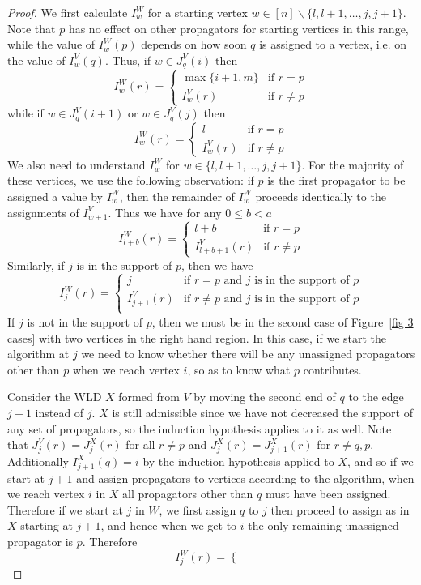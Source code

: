 \documentclass[11pt]{article}
\theoremstyle{remark}
\theoremstyle{definition}
\begin{document}
\begin{proof}
We first calculate $I^{W}_w$ for a starting vertex ${w \in [n]\backslash \{l, l+1, \ldots,j,j+1\}}$. Note that $p$ has no effect on other propagators for starting vertices in this range, while the value of $I^{W}_w(p)$ depends on how soon $q$ is assigned to a vertex, i.e. on the value of $I^{V}_w(q)$. Thus, if $w\in J_q^{V}(i)$ then
    \[
    I_w^{W}(r) =  \begin{cases}
        \max\{i+1, m\} & \text{if } r=p \\
        I_{w}^{V}(r) & \text{if } r\neq p
      \end{cases} 
    \]
    while if $w\in J_q^{V}(i+1)$ or $w\in J_q^{V}(j)$ then
    \[
    I_w^{W}(r) =  \begin{cases}
        l & \text{if } r=p \\
        I_{w}^{V}(r) & \text{if } r\neq p
      \end{cases} 
      \]
We also need to understand $I^{W}_w$ for $w \in \{l,l+1,\ldots,j,j+1\}$. For the majority of these vertices, we use the following observation: if $p$ is the first propagator to be assigned a value by $I_w^{W}$, then the remainder of $I_w^{W}$ proceeds identically to the assignments of $I^{V}_{w+1}$.  Thus we have for any $0\leq b <a$
    \[
    I_{l+b}^{W}(r) = \begin{cases}
      l+b & \text{if } r=p\\
      I_{l+b+1}^{V}(r) & \text{if } r\neq p
    \end{cases}
    \]
Similarly, if $j$ is in the support of $p$, then we have
     \[
       I_j^{W}(r) = \begin{cases}
         j & \text{if $r=p$ and $j$ is in the support of $p$}\\
         I_{j+1}^{V}(r) & \text{if $r\neq p$ and $j$ is in the support of $p$}\\
       \end{cases}
       \]
If $j$ is not in the support of $p$, then we must be in the second case of Figure~\ref{fig 3 cases} with two vertices in the right hand region.  In this case, if we start the algorithm at $j$ we need to know whether there will be any unassigned propagators other than $p$ when we reach vertex $i$, so as to know what $p$ contributes.

Consider the WLD $X$ formed from $V$ by moving the second end of $q$ to the edge $j-1$ instead of $j$.  $X$ is still admissible since we have not decreased the support of any set of propagators, so the induction hypothesis applies to it as well.  Note that $J_{j}^{V}(r) = J_{j}^{X}(r)$ for all $r\neq p$ and $J_{j}^{X}(r) = J_{j+1}^{X}(r)$ for $r\neq q,p$.  Additionally $I_{j+1}^{X}(q) = i$ by the induction hypothesis applied to $X$, and so if we start at $j+1$ and assign propagators to vertices according to the algorithm, when we reach vertex $i$ in $X$ all propagators other than $q$ must have been assigned.  Therefore if we start at $j$ in $W$, we first assign $q$ to $j$ then proceed to assign as in $X$ starting at $j+1$, and hence when we get to $i$ the only remaining unassigned propagator is $p$. Therefore
       \[
       I_j^{W}(r) = \begin{cases}


\end{cases}\]
\end{proof}
\end{document}
